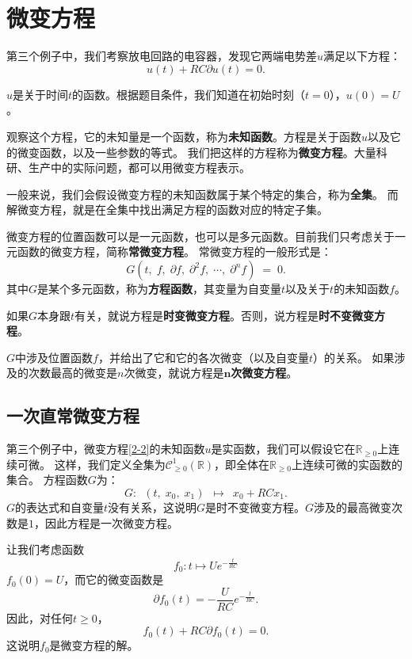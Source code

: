 \documentclass[12pt,UTF8]{ctexbook}
\theoremstyle{definition}
\theoremstyle{plain}
\begin{document}
\section{微变方程}

第三个例子中，我们考察放电回路的电容器，发现它两端电势差$u$满足以下方程：
\begin{equation}
    u(t) + RC\partial  u(t) = 0. \label{2-2}
\end{equation}

$u$是关于时间$t$的函数。根据题目条件，我们知道在初始时刻（$t=0$），$u(0) = U$。

观察这个方程，它的未知量是一个函数，称为\textbf{未知函数}。方程是关于函数$u$以及它的微变函数，以及一些参数的等式。
我们把这样的方程称为\textbf{微变方程}。大量科研、生产中的实际问题，都可以用微变方程表示。

一般来说，我们会假设微变方程的未知函数属于某个特定的集合，称为\textbf{全集}。
而解微变方程，就是在全集中找出满足方程的函数对应的特定子集。

微变方程的位置函数可以是一元函数，也可以是多元函数。目前我们只考虑关于一元函数的微变方程，简称\textbf{常微变方程}。
常微变方程的一般形式是：
$$ G(t, \; f, \; \partial f, \; \partial^2 f, \; \cdots , \; \partial^n f)\;  =\;  0.$$
其中$G$是某个多元函数，称为\textbf{方程函数}，其变量为自变量$t$以及关于$t$的未知函数$f$。

如果$G$本身跟$t$有关，就说方程是\textbf{时变微变方程}。否则，说方程是\textbf{时不变微变方程}。

$G$中涉及位置函数$f$，并给出了它和它的各次微变（以及自变量$t$）的关系。
如果涉及的次数最高的微变是$n$次微变，就说方程是$\boldsymbol{n}$\textbf{次微变方程}。

\subsection{一次直常微变方程}
第三个例子中，微变方程\eqref{2-2}的未知函数$u$是实函数，我们可以假设它在$\mathbb{R}_{\geqslant 0}$上连续可微。
这样，我们定义全集为$\mathcal{C}^1_{\geqslant 0}(\mathbb{R})$，即全体在$\mathbb{R}_{\geqslant 0}$上连续可微的实函数的集合。
方程函数$G$为：
$$ G: \,\,\,(t, \; x_0, \; x_1) \,\,\, \mapsto \,\,\, x_0 + RC x_1. $$
$G$的表达式和自变量$t$没有关系，这说明$G$是时不变微变方程。$G$涉及的最高微变次数是$1$，因此方程是一次微变方程。

让我们考虑函数
$$f_0: t\mapsto Ue^{-\frac{t}{RC}}$$
$f_0(0) = U$，而它的微变函数是
$$\partial f_0(t) = -\frac{U}{RC} e^{-\frac{t}{RC}}. $$
因此，对任何$t\geqslant 0$，
$$ f_0(t) + RC\partial f_0(t) = 0.$$
这说明$f_0$是微变方程的解。
\end{document}
